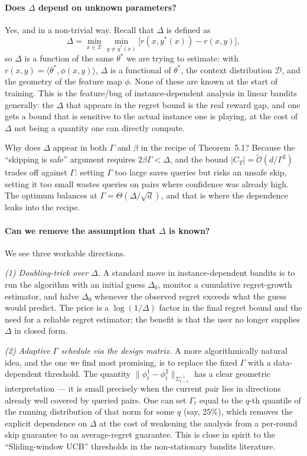 \documentclass[11pt]{article}
\newcommand{\Otilde}{\tilde{\mathcal{O}}}
\begin{document}
\paragraph{Does $\Delta$ depend on unknown parameters?}
Yes, and in a non-trivial way. Recall that $\Delta$ is defined as
\[
  \Delta = \min_{x \in \mathcal{X}} \min_{y \neq y^*(x)}
    \bigl[ r(x, y^*(x)) - r(x, y) \bigr],
\]
so $\Delta$ is a function of the same $\theta^*$ we are trying to estimate: with $r(x, y) = \langle \theta^*, \phi(x, y) \rangle$, $\Delta$ is a functional of $\theta^*$, the context distribution $\mathcal{D}$, and the geometry of the feature map $\phi$. None of these are known at the start of training. This is the feature/bug of instance-dependent analysis in linear bandits generally: the $\Delta$ that appears in the regret bound is the real reward gap, and one gets a bound that is sensitive to the actual instance one is playing, at the cost of $\Delta$ not being a quantity one can directly compute.

Why does $\Delta$ appear in both $\Gamma$ and $\beta$ in the recipe of Theorem~5.1? Because the ``skipping is safe'' argument requires $2\beta\Gamma < \Delta$, and the bound $|C_T| = \Otilde(d / \Gamma^2)$ trades off against $\Gamma$: setting $\Gamma$ too large saves queries but risks an unsafe skip, setting it too small wastes queries on pairs where confidence was already high. The optimum balances at $\Gamma = \Theta(\Delta / \sqrt{d})$, and that is where the dependence leaks into the recipe.

\paragraph{Can we remove the assumption that $\Delta$ is known?}
We see three workable directions.

\emph{(1) Doubling-trick over $\Delta$.} A standard move in instance-dependent bandits is to run the algorithm with an initial guess $\Delta_0$, monitor a cumulative regret-growth estimator, and halve $\Delta_0$ whenever the observed regret exceeds what the guess would predict. The price is a $\log(1/\Delta)$ factor in the final regret bound and the need for a reliable regret estimator; the benefit is that the user no longer supplies $\Delta$ in closed form.

\emph{(2) Adaptive $\Gamma$ schedule via the design matrix.} A more algorithmically natural idea, and the one we find most promising, is to replace the fixed $\Gamma$ with a data-dependent threshold. The quantity $\|\phi_t^1 - \phi_t^2\|_{\Sigma_{t-1}^{-1}}$ has a clear geometric interpretation --- it is small precisely when the current pair lies in directions already well covered by queried pairs. One can set $\Gamma_t$ equal to the $q$-th quantile of the running distribution of that norm for some $q$ (say, 25\%), which removes the explicit dependence on $\Delta$ at the cost of weakening the analysis from a per-round skip guarantee to an average-regret guarantee. This is close in spirit to the ``Sliding-window UCB'' thresholds in the non-stationary bandits literature.
\end{document}
